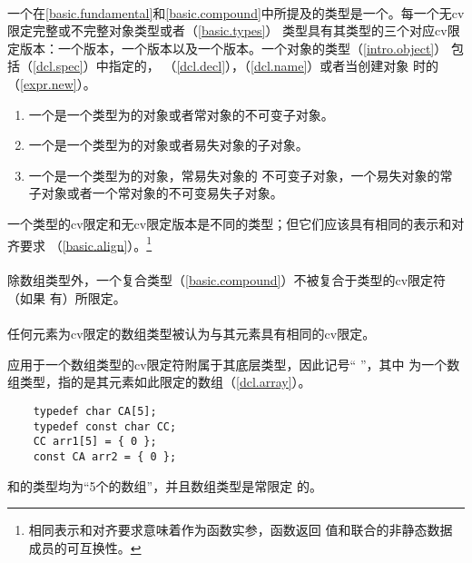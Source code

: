 \paragraph{} %
一个在\ref{basic.fundamental}和\ref{basic.compound}中所提及的类型是一个。每一个无cv限定完整或不完整对象类型或者（\ref{basic.types}）
类型具有其类型的三个对应cv限定版本：一个版本，一个版本以及一个版本。一个对象的类型（\ref{intro.object}）
包括（\ref{dcl.spec}）中指定的，
（\ref{dcl.decl}），（\ref{dcl.name}）或者当创建对象
时的（\ref{expr.new}）。
\begin{enumerate}
  \item 一个是一个类型为的对象或者常对象的不可变子对象。
  \item 一个是一个类型为的对象或者易失对象的子对象。
  \item 一个是一个类型为的对象，常易失对象的
        不可变子对象，一个易失对象的常子对象或者一个常对象的不可变易失子对象。
\end{enumerate}
一个类型的cv限定和无cv限定版本是不同的类型；但它们应该具有相同的表示和对齐要求
（\ref{basic.align}）。\footnote{相同表示和对齐要求意味着作为函数实参，函数返回
值和联合的非静态数据成员的可互换性。}

\paragraph{} %
除数组类型外，一个复合类型（\ref{basic.compound}）不被复合于类型的cv限定符（如果
有）所限定。

\paragraph{} %
任何元素为cv限定的数组类型被认为与其元素具有相同的cv限定。

\begin{note}
  应用于一个数组类型的cv限定符附属于其底层类型，因此记号“ ”，其中
  为一个数组类型，指的是其元素如此限定的数组（\ref{dcl.array}）。
\end{note}

\begin{example}
  \begin{lstlisting}
    typedef char CA[5];
    typedef const char CC;
    CC arr1[5] = { 0 };
    const CA arr2 = { 0 };
  \end{lstlisting}
  和的类型均为“5个的数组”，并且数组类型是常限定
  的。
\end{example}

